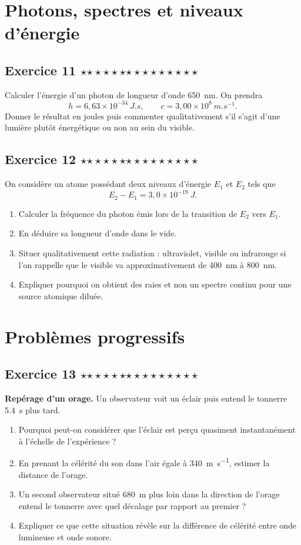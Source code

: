 \documentclass[11pt,a4paper]{article}
\newcommand{\etoiles}[1]{%
\ifcase#1\or $\star$\or $\star\star$\or $\star\star\star$\or $\star\star\star\star$\or $\star\star\star\star\star$\fi}
\newcommand{\exostar}[2]{\subsection*{Exercice #1 \hfill \etoiles{#2}}}
\begin{document}
\section{Photons, spectres et niveaux d'énergie}

\exostar{11}{2}
Calculer l'énergie d'un photon de longueur d'onde \SI{650}{nm}. On prendra
\[
 h = 6{,}63\times 10^{-34}\ \si{J.s},\qquad c=3{,}00\times10^8\ \si{m.s^{-1}}.
\]
Donner le résultat en joules puis commenter qualitativement s'il s'agit d'une lumière plutôt énergétique ou non au sein du visible.

\exostar{12}{3}
On considère un atome possédant deux niveaux d'énergie $E_1$ et $E_2$ tels que
\[
E_2-E_1 = 3{,}0\times 10^{-19}\ \si{J}.
\]
\begin{enumerate}[label=\alph*)]
    \item Calculer la fréquence du photon émis lors de la transition de $E_2$ vers $E_1$.
    \item En déduire sa longueur d'onde dans le vide.
    \item Situer qualitativement cette radiation : ultraviolet, visible ou infrarouge si l'on rappelle que le visible va approximativement de \SI{400}{nm} à \SI{800}{nm}.
    \item Expliquer pourquoi on obtient des raies et non un spectre continu pour une source atomique diluée.
\end{enumerate}

\section{Problèmes progressifs}

\exostar{13}{3}
\textbf{Repérage d'un orage.} Un observateur voit un éclair puis entend le tonnerre \SI{5,4}{s} plus tard.
\begin{enumerate}[label=\alph*)]
    \item Pourquoi peut-on considérer que l'éclair est perçu quasiment instantanément à l'échelle de l'expérience ?
    \item En prenant la célérité du son dans l'air égale à \SI{340}{m.s^{-1}}, estimer la distance de l'orage.
    \item Un second observateur situé \SI{680}{m} plus loin dans la direction de l'orage entend le tonnerre avec quel décalage par rapport au premier ?
    \item Expliquer ce que cette situation révèle sur la différence de célérité entre onde lumineuse et onde sonore.
\end{enumerate}
\end{document}
